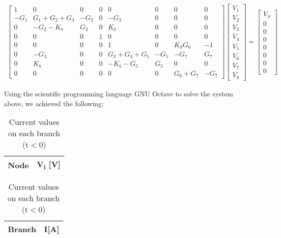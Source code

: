 \begin{gather}
\begin{bmatrix}
1 & 0 & 0 & 0 & 0 & 0 & 0 & 0\\
-G_1 & G_1+G_2+G_3 & -G_2& 0 & -G_3 & 0 & 0 & 0\\
0 & -G_2-K_b & G_2 & 0 & K_b & 0 & 0 & 0\\
0 & 0 & 0 & 1 & 0 & 0 & 0 & 0\\
0 & 0 & 0 & 0 & 1 & 0 & K_d G_6 & -1\\
0 & -G_3 & 0 & 0 & G_3+G_4+G_5 & -G_5 & -G_7 & G_7\\
0 & K_b & 0 & 0 & -K_b-G_5 & G_5 & 0 & 0\\
0 & 0 & 0 & 0 & 0 & 0 & G_6+G_7 & -G_7
\end{bmatrix}
\begin{bmatrix}
 V_1\\
 V_2\\
 V_3\\
 V_4\\
 V_5\\
 V_6\\
 V_7\\
 V_8
\end{bmatrix}
=
\begin{bmatrix}
 V_S\\
 0\\
 0\\
 0\\
 0\\
 0\\
 0\\
 0
\end{bmatrix}
\end{gather}

Using the scientific programming language GNU Octave to solve the system above, we achieved the following:


\begin{table}[!htb]
    \begin{minipage}{.5\linewidth}
      
      \centering
        \begin{tabular}{|c|c|}
        \hline    
        {\bf Node} & {\bf V\textsubscript{i} [V]} \\ \hline
        
        \end{tabular}
        \caption{Voltage values on each node (t$<$0)}
    \end{minipage}%
    \begin{minipage}{.5\linewidth}
      \centering
        
        \begin{tabular}{|c|c|}
        \hline    
        {\bf Branch} & {\bf I[A]} \\ \hline
        
        \end{tabular}
        \caption{Current values on each branch (t$<$0)}
    \end{minipage} 
\end{table}

